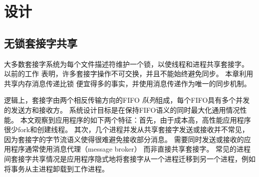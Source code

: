 

\section{设计}
\label{socksdirect:sec:design}


\subsection{无锁套接字共享}
\label{socksdirect:subsec:fork}


大多数套接字系统为每个文件描述符维护一个锁，以使线程和进程共享套接字。
以前的工作 \cite {boyd2010analysis,clements2015scalable} 表明，许多套接字操作不可交换，并且不能始终避免同步。
本章利用共享内存消息传递比锁 \cite {roghanchi2017ffwd} 便宜得多的事实，并使用消息传递作为唯一的同步机制。


逻辑上，套接字由两个相反传输方向的FIFO \emph {队列}组成，每个FIFO具有多个并发的发送方和接收方。
系统设计目标是在保持FIFO语义的同时最大化通用情况性能。
本文观察到应用程序的如下两个特征：首先，由于成本高，高性能应用程序很少fork和创建线程。
其次，几个进程并发从共享套接字发送或接收并不常见，因为套接字的字节流语义使得很难避免接收部分消息。
需要同时发送或接收的应用程序通常使用消息代理（message broker） \cite {hintjens2013zeromq,rabbitmq2017rabbitmq,kreps2011kafka} 而非直接共享套接字。
常见的进程间套接字共享情况是应用程序隐式地将套接字从一个进程迁移到另一个进程，例如将事务从主进程卸载到工作进程。






